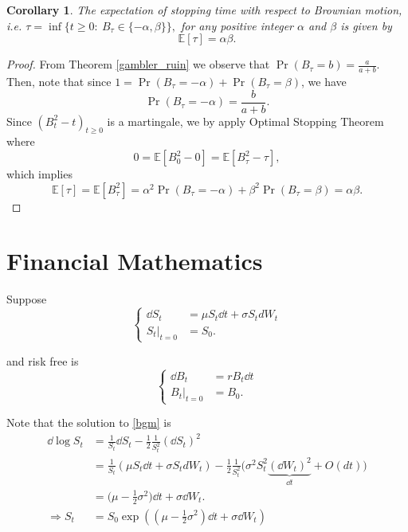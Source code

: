 \documentclass[10pt]{article}
\theoremstyle{remark}
\theoremstyle{plain}
\newtheorem{Corollary}{Corollary}[section]
\newcommand{\E}{\mathbb{E}}
\numberwithin{equation}{section}
\renewcommand{\geq}{\geqslant}
\begin{document}
\begin{Corollary}
	The expectation of stopping time with respect to Brownian motion, i.e. 
	$
		\tau = \inf \{t \geq 0:\ B_\tau \in \{ - \alpha, \beta\} \},
	$
	for any positive integer $\alpha$ and $\beta$ is given by 
	\[
		\mathbb{E}[\tau] = \alpha \beta.
	\]
\end{Corollary}

\begin{proof}
	From Theorem \eqref{gambler_ruin} we observe that $\Pr(B_\tau = b) = \frac{a}{a+b}$. Then, note that since $1 = \Pr(B_\tau = -\alpha) + \Pr(B_\tau = \beta) $, we have
	\[
		\Pr(B_\tau =  - \alpha) = \frac{b}{a+b}.
	\]
	 Since $(B_t^2 - t)_{t \geq 0}$ is a martingale, we by apply Optimal Stopping Theorem where
	\[
		0 = \mathbb{E}[B_0^2 - 0] = \mathbb{E} [B_\tau^2 - \tau], 
	\]
	which implies
	\[
	\mathbb{E}[\tau] = \E[B_\tau^2 ] =  \alpha^2 	\Pr(B_\tau =  - \alpha) + \beta^2 	\Pr(B_\tau =  \beta) = \alpha \beta.
	\]
\end{proof}

%
%
\clearpage
\section{Financial Mathematics}
Suppose 
\begin{equation}\label{bgm}
	\begin{cases}
	\dd{S_t} &= \mu S_t \dd{t} + \sigma S_t dW_t \\ 
	S_t \big|_{t=0} &= S_0.
\end{cases}
\end{equation}

and risk free is
\[
\begin{cases}
	\dd{B_t} &= r B_t \dd{t} \\ 
	B_t \big|_{t=0} &= B_0.
\end{cases}
\]

Note that the solution to \eqref{bgm} is
\begin{align*}
	\dd{\log S_t} & = \frac{1}{S_t} \dd{S_t} - \frac{1}{2} \frac{1}{S^2_t} \left(\dd{S_t}\right)^2
	\\
	& = \frac{1}{S_t} \left(\mu S_t \dd{t} + \sigma S_t dW_t \right) - \frac{1}{2} \frac{1}{S^2_t} \big(\sigma^2 S_t^2  \underbrace{\left(\dd{W_t}\right)^2}_{\dd{t}}  + O(dt)\big) 
	\\
	& = \bigg(\mu - \frac{1}{2} \sigma^2 \bigg) \dd{t} + \sigma \dd{W_t}.
	\\
	\Rightarrow  S_t & = S_0 \exp( (\mu - \frac{1}{2} \sigma^2 ) \dd{t} + \sigma \dd{W_t})
\end{align*}
\end{document}
